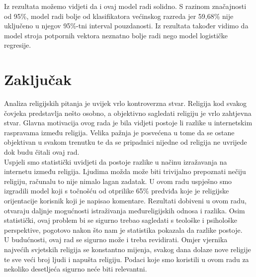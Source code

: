 \documentclass[times,utf8,zavrsni]{fer}
\begin{document}
Iz rezultata možemo vidjeti da i ovaj model radi solidno. S razinom značajnosti od 95\%, model radi bolje od klasifikatora većinskog razreda jer 59,68\% nije uključeno u njegov 95\%-tni interval pouzdanosti. Iz rezultata također vidimo da model stroja potpornih vektora neznatno bolje radi nego model logističke regresije. \\


\chapter{Zaključak}

Analiza religijskih pitanja je uvijek vrlo kontroverzna stvar. Religija kod svakog čovjeka predstavlja nešto osobno, a objektivno sagledati religiju je vrlo zahtjevna stvar. Glavna motivacija ovog rada je bila vidjeti postoje li razlike u internetskim raspravama između religija. Velika pažnja je posvećena u tome da se ostane objektivan u svakom trenutku te da se pripadnici nijedne od religija ne uvrijede dok budu čitali ovaj rad. \\

Uspjeli smo statistički uvidjeti da postoje razlike u načinu izražavanja na internetu između religija. Ljudima možda može biti trivijalno prepoznati nečiju religiju, računalu to nije nimalo lagan zadatak. U ovom radu uspješno smo izgradili model koji s točnošću od otprilike 65\% predviđa koje je religijske orijentacije korisnik koji je napisao komentare. Rezultati dobiveni u ovom radu, otvaraju daljnje mogućnosti istraživanja međureligijskih odnosa i razlika. Osim statistički, ovaj problem bi se sigurno trebao sagledati s teološke i psihološke perspektive, pogotovo nakon što nam je statistika pokazala da razlike postoje. \\

U budućnosti, ovaj rad se sigurno može i treba revidirati. Omjer vjernika najvećih svjetskih religija se konstantno mijenja, svakog dana dolaze nove religije te sve veći broj ljudi i napušta religiju. Podaci koje smo koristili u ovom radu za nekoliko desetljeća sigurno neće biti relevantni.







\end{document}
